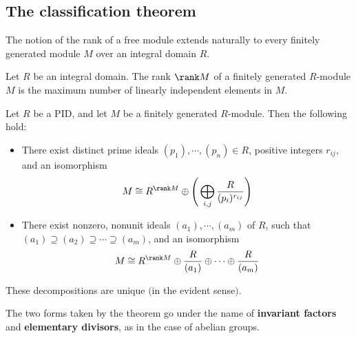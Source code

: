 \subsection{The classification theorem}
The notion of the rank of a free module extends naturally to every finitely generated module $M$ over an integral domain $R$.
\begin{definition}
Let $R$ be an integral domain. The rank $\rank M$ of a finitely generated $R$-module $M$ is the maximum number of linearly independent elements in $M$.
\end{definition}
\begin{theorem}\label{PID fg modu class}
Let $R$ be a PID, and let $M$ be a finitely generated $R$-module. Then the following hold:
\begin{itemize}
\item There exist distinct prime ideals $(p_1),\cdots,(p_n)\in R$, positive integers $r_{ij}$, and
an isomorphism
\[M\cong R^{\rank M}\oplus\Bigg(\bigoplus_{i,j}\dfrac{R}{(p_i)^{r_{ij}}}\Bigg)\]
\item There exist nonzero, nonunit ideals $(a_1),\cdots,(a_m)$ of $R$, such that $(a_1)\supseteq(a_2)\supseteq\cdots\supseteq(a_m)$, and an isomorphism
\[M\cong R^{\rank M}\oplus\dfrac{R}{(a_1)}\oplus\cdots\oplus\dfrac{R}{(a_m)}\]
\end{itemize}
These decompositions are unique $($in the evident sense$)$.
\end{theorem}
The two forms taken by the theorem go under the name of \textbf{invariant factors} and \textbf{elementary divisors}, as in the case of abelian groups.\par
